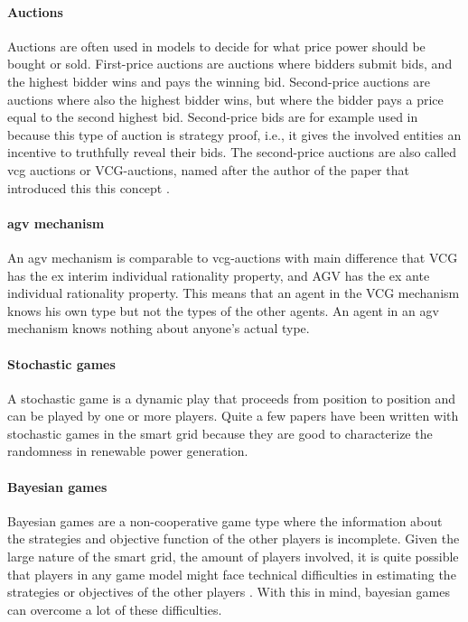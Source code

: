 \paragraph{Auctions}
Auctions are often used in models to decide for what price power should be bought or sold. First-price auctions are auctions where bidders submit bids, and the highest bidder wins and pays the winning bid. Second-price auctions are auctions where also the highest bidder wins, but where the bidder pays a price equal to the second highest bid. Second-price bids are for example used in \cite{SaadHanPoorEtAl2011} because this type of auction is strategy proof, i.e., it gives the involved entities an incentive to truthfully reveal their bids. The second-price auctions are also called \ac{vcg} auctions or VCG-auctions, named after the author of the paper that introduced this this concept \cite{Vickrey1961}.

\paragraph{\ac{agv} mechanism}
An \ac{agv} mechanism is comparable to \ac{vcg}-auctions with main difference that VCG has the ex interim individual rationality property, and AGV has the ex ante individual rationality property\cite{ShohamLeyton-Brown2008}. This means that an agent in the VCG mechanism knows his own type but not the types of the other agents. An agent in an \ac{agv} mechanism knows nothing about anyone’s actual type. 

\paragraph{Stochastic games}
A stochastic game is a dynamic play that proceeds from position to position \cite{Shapley1953} and can be played by one or more players. Quite a few papers have been written with stochastic games in the smart grid \cite{LiangZhuang2014} because they are good to characterize the randomness in renewable power generation.  

\paragraph{Bayesian games}
Bayesian games are a non-cooperative game type where the information about the strategies and objective function of the other players is incomplete. Given the large nature of the smart grid, the amount of players involved, it is quite possible that players in any game model might face technical difficulties in estimating the strategies or objectives of the other players \cite{keypaper}. With this in mind, bayesian games can overcome a lot of these difficulties.

